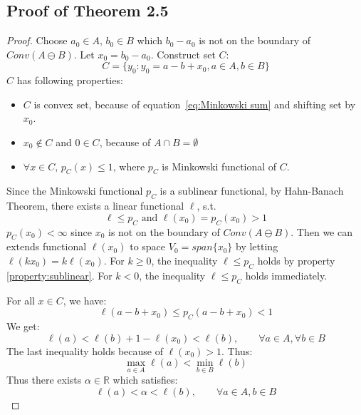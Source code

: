 \documentclass{article}
\begin{document}
\subsection{Proof of Theorem 2.5}
\label{subsec:proof separation}
\begin{proof}
	Choose $a_0\in A\text{, }b_0\in B$ which $b_0-a_0$ is not on the boundary of $Conv(A\ominus B)$. Let $x_0=b_0-a_0$. Construct set $C$:
	\begin{equation}\label{def:C}
		C=\{y_0:y_0=a-b+x_0,a\in A, b\in B\}
	\end{equation}
	$C$ has following properties:
	\begin{itemize}
		\item $C$ is convex set, because of equation~\ref{eq:Minkowski sum} and shifting set by $x_0$.
		\item $x_0 \notin C$ and $0\in C$, because of $A\cap B=\emptyset$
		\item $\forall x\in C\text{, }p_C(x)\leq1$, where $p_C$ is Minkowski functional of $C$.
	\end{itemize}
	Since the Minkowski functional $p_C$ is a sublinear functional, by Hahn-Banach Theorem, there exists a linear functional $\ell$, s.t.
	\begin{equation*}
		\ell\le p_C\text{ and }\ell(x_0)=p_C(x_0)> 1
	\end{equation*}
	$p_C(x_0)<\infty$ since $x_0$ is not on the boundary of $Conv(A\ominus B)$.
	Then we can extends functional $\ell(x_0)$ to space $V_0=span\{x_0\}$ by letting $\ell(kx_0)=k\ell(x_0)$. For $k\geq0$, the inequality $\ell\leq p_C$ holds by
	property \eqref{property:sublinear}. For $k<0$, the inequality $\ell\leq p_C$ holds immediately.\par
	For all $x\in C$, we have:
	\begin{equation*}
		\ell(a-b+x_0)\le p_C(a-b+x_0)<1
	\end{equation*}
	We get:
	\begin{equation}\label{gamma bound}
		\ell(a)<\ell(b)+1-\ell(x_0)< \ell(b),\qquad\forall a\in A, \forall b\in B
	\end{equation}
	The last inequality holds because of $\ell(x_0)>1$. Thus:
	\begin{equation*}
		\max_{a\in A}{\ell(a)}<\min_{b\in B}{\ell(b)}
	\end{equation*}
	Thus there exists $\alpha\in\mathbb{R}$ which satisfies:
	\begin{equation*}
		\ell(a)<\alpha<\ell(b), \qquad\forall a\in A,b\in B
	\end{equation*}
\end{proof}
\end{document}
